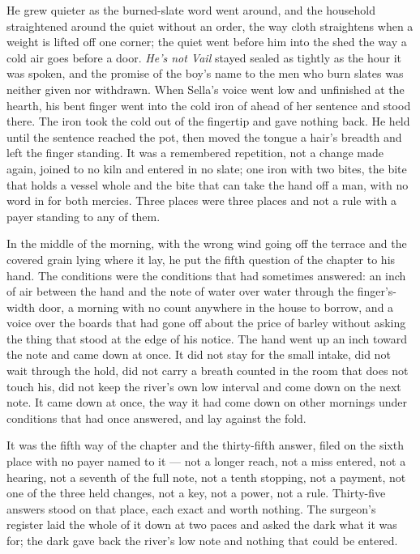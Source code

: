 He grew quieter as the burned-slate word went around, and the household straightened around the quiet without an order, the way cloth straightens when a weight is lifted off one corner; the quiet went before him into the shed the way a cold air goes before a door. \emph{He's not Vail} stayed sealed as tightly as the hour it was spoken, and the promise of the boy's name to the men who burn slates was neither given nor withdrawn. When Sella's voice went low and unfinished at the hearth, his bent finger went into the cold iron of  ahead of her sentence and stood there. The iron took the cold out of the fingertip and gave nothing back. He held until the sentence reached the pot, then moved the tongue a hair's breadth and left the finger standing. It was a remembered repetition, not a change made again, joined to no kiln and entered in no slate; one iron with two bites, the bite that holds a vessel whole and the bite that can take the hand off a man, with no word in  for both mercies. Three places were three places and not a rule with a payer standing to any of them.

\scenebreak

In the middle of the morning, with the wrong wind going off the terrace and the covered grain lying where it lay, he put the fifth question of the chapter to his hand. The conditions were the conditions that had sometimes answered: an inch of air between the hand and the note of water over water through the finger's-width door, a morning with no count anywhere in the house to borrow, and a voice over the boards that had gone off about the price of barley without asking the thing that stood at the edge of his notice. The hand went up an inch toward the note and came down at once. It did not stay for the small intake, did not wait through the hold, did not carry a breath counted in the room that does not touch his, did not keep the river's own low interval and come down on the next note. It came down at once, the way it had come down on other mornings under conditions that had once answered, and lay against the fold.

It was the fifth way of the chapter and the thirty-fifth answer, filed on the sixth place with no payer named to it --- not a longer reach, not a miss entered, not a hearing, not a seventh of the full note, not a tenth stopping, not a payment, not one of the three held changes, not a key, not a power, not a rule. Thirty-five answers stood on that place, each exact and worth nothing. The surgeon's register laid the whole of it down at two paces and asked the dark what it was for; the dark gave back the river's low note and nothing that could be entered.

